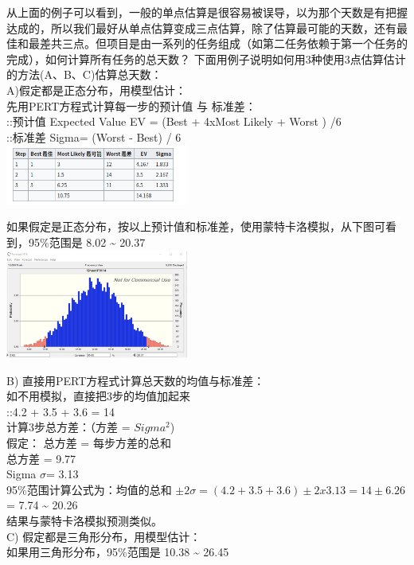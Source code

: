 从上面的例子可以看到，一般的单点估算是很容易被误导，以为那个天数是有把握达成的，所以我们最好从单点估算变成三点估算，除了估算最可能的天数，还有最佳和最差共三点。但项目是由一系列的任务组成（如第二任务依赖于第一个任务的完成），如何计算所有任务的总天数？
下面用例子说明如何用3种使用3点估算估计的方法(A、B、C)估算总天数：\\
A)假定都是正态分布，用模型估计：\\
先用PERT方程式计算每一步的预计值 与 标准差：\\
::预计值 Expected Value EV = (Best + 4xMost Likely + Worst ) /6\\
::标准差 Sigma= (Worst - Best) / 6\\


\includegraphics[width=6cm]{Screenshotfrom2023-11-1221-23-06.png}

如果假定是正态分布，按以上预计值和标准差，使用蒙特卡洛模拟，从下图可看到，95\%范围是
8.02 \textasciitilde{} 20.37\\

\includegraphics[width=6cm]{pert31.png}

B) 直接用PERT方程式计算总天数的均值与标准差：\\
如不用模拟，直接把3步的均值加起来\\
::4.2 + 3.5 + 3.6 = 14\\
计算3步总方差：（方差 = \(Sigma^2\))\\
假定： 总方差 = 每步方差的总和\\
总方差 = 9.77\\
Sigma \(\sigma\)= 3.13\\
95\%范围计算公式为：均值的总和
\(\pm 2 \sigma = (4.2 + 3.5 + 3.6) \pm 2 x 3.13  = 14 \pm 6.26\)= 7.74
\textasciitilde{} 20.26\\
结果与蒙特卡洛模拟预测类似。\\
C) 假定都是三角形分布，用模型估计：\\
如果用三角形分布，95\%范围是 10.38 \textasciitilde{} 26.45\\

